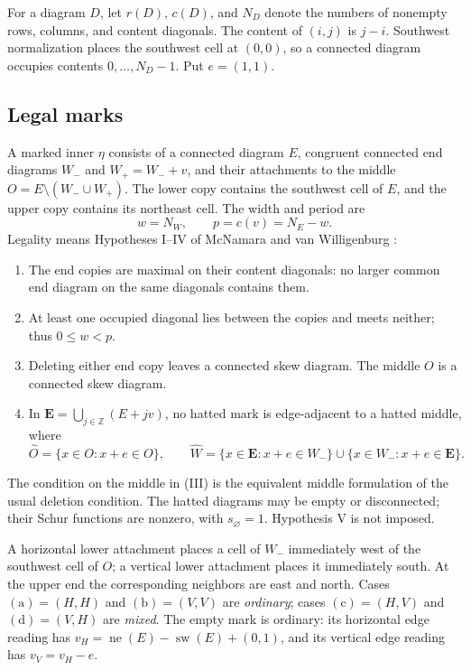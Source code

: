 \documentclass[11pt,a4paper]{amsart}
\numberwithin{equation}{section}
\theoremstyle{plain}
\theoremstyle{definition}
\newcommand{\Z}{\mathbb Z}
\begin{document}
For a diagram \(D\), let \(r(D)\), \(c(D)\), and \(N_D\) denote the numbers of nonempty rows, columns, and content diagonals.  The content of \((i,j)\) is \(j-i\).  Southwest normalization places the southwest cell at \((0,0)\), so a connected diagram occupies contents \(0,\ldots,N_D-1\).  Put \(e=(1,1)\).

\subsection{Legal marks}

A marked inner \(\eta\) consists of a connected diagram \(E\), congruent connected end diagrams \(W_-\) and \(W_+=W_-+v\), and their attachments to the middle
\(O=E\setminus(W_-\cup W_+)\).
The lower copy contains the southwest cell of \(E\), and the upper copy contains its northeast cell.  The width and period are
\begin{equation}\label{eq:period}
 w=N_W,\qquad p=c(v)=N_E-w.
\end{equation}
Legality means Hypotheses I--IV of McNamara and van Willigenburg \cite{McNamara2009Classification}:
\begin{enumerate}
\item[(I)] The end copies are maximal on their content diagonals: no larger common end diagram on the same diagonals contains them.
\item[(II)] At least one occupied diagonal lies between the copies and meets neither; thus \(0\le w<p\).
\item[(III)] Deleting either end copy leaves a connected skew diagram.  The middle \(O\) is a connected skew diagram.
\item[(IV)] In \(\boldsymbol E=\bigcup_{j\in\Z}(E+jv)\), no hatted mark is edge-adjacent to a hatted middle, where
\begin{equation}\label{eq:hats}
 \widehat O=\{x\in O:x+e\in O\},\qquad
 \widehat W=\{x\in\boldsymbol E:x+e\in W_-\}
       \cup\{x\in W_-:x+e\in\boldsymbol E\}.
\end{equation}
\end{enumerate}
The condition on the middle in (III) is the equivalent middle formulation of the usual deletion condition.  The hatted diagrams may be empty or disconnected; their Schur functions are nonzero, with \(s_\varnothing=1\).  Hypothesis V is not imposed.

A horizontal lower attachment places a cell of \(W_-\) immediately west of the southwest cell of \(O\); a vertical lower attachment places it immediately south.  At the upper end the corresponding neighbors are east and north.  Cases \(\mathrm{(a)}=(H,H)\) and \(\mathrm{(b)}=(V,V)\) are \emph{ordinary}; cases \(\mathrm{(c)}=(H,V)\) and \(\mathrm{(d)}=(V,H)\) are \emph{mixed}.  The empty mark is ordinary: its horizontal edge reading has
\(v_H=\operatorname{ne}(E)-\operatorname{sw}(E)+(0,1)\),
and its vertical edge reading has \(v_V=v_H-e\).
\end{document}

